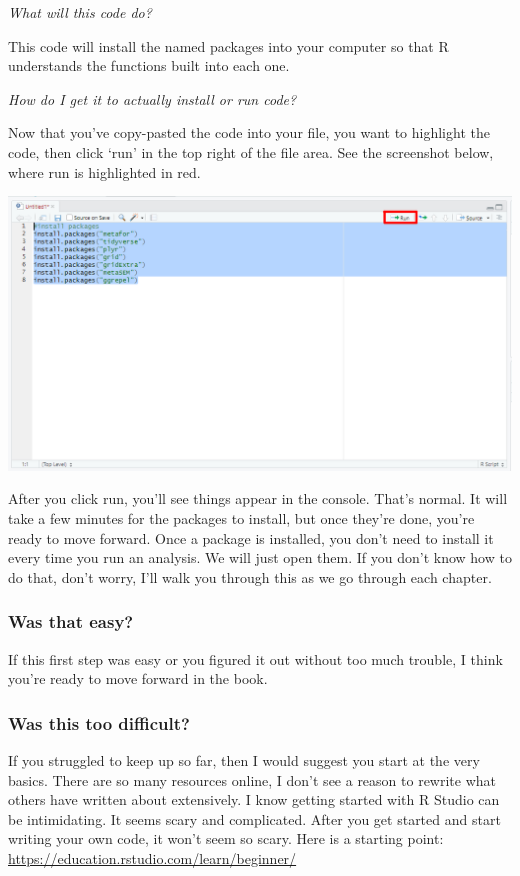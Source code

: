 \documentclass[
]{book}
\begin{document}
\emph{What will this code do?}

This code will install the named packages into your computer so that R understands the functions built into each one.

\emph{How do I get it to actually install or run code?}

Now that you've copy-pasted the code into your file, you want to highlight the code, then click `run' in the top right of the file area. See the screenshot below, where run is highlighted in red.

\includegraphics[width=1\textwidth,height=\textheight]{images/runbutton.PNG}

After you click run, you'll see things appear in the console. That's normal. It will take a few minutes for the packages to install, but once they're done, you're ready to move forward. Once a package is installed, you don't need to install it every time you run an analysis. We will just open them. If you don't know how to do that, don't worry, I'll walk you through this as we go through each chapter.

\hypertarget{was-that-easy}{%
\subsubsection{Was that easy?}\label{was-that-easy}}

If this first step was easy or you figured it out without too much trouble, I think you're ready to move forward in the book.

\hypertarget{was-this-too-difficult}{%
\subsubsection{Was this too difficult?}\label{was-this-too-difficult}}

If you struggled to keep up so far, then I would suggest you start at the very basics. There are so many resources online, I don't see a reason to rewrite what others have written about extensively. I know getting started with R Studio can be intimidating. It seems scary and complicated. After you get started and start writing your own code, it won't seem so scary. Here is a starting point: \url{https://education.rstudio.com/learn/beginner/}
\end{document}
